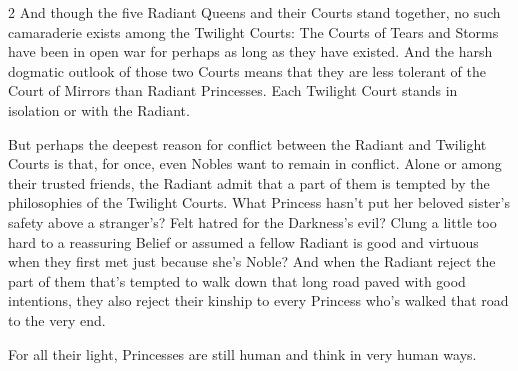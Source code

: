 \begin{multicols}{2}
And though the five Radiant Queens and their Courts stand together, no such camaraderie exists among the Twilight Courts: The Courts of Tears and Storms have been in open war for perhaps as long as they have existed. And the harsh dogmatic outlook of those two Courts means that they are less tolerant of the Court of Mirrors than Radiant Princesses. Each Twilight Court stands in isolation or with the Radiant. 

But perhaps the deepest reason for conflict between the Radiant and Twilight Courts is that, for once, even Nobles want to remain in conflict. Alone or among their trusted friends, the Radiant admit that a part of them is tempted by the philosophies of the Twilight Courts. What Princess hasn't put her beloved sister's safety above a stranger's? Felt hatred for the Darkness's evil? Clung a little too hard to a reassuring Belief or assumed a fellow Radiant is good and virtuous when they first met just because she's Noble? And when the Radiant reject the part of them that's tempted to walk down that long road paved with good intentions, they also reject their kinship to every Princess who's walked that road to the very end. 

For all their light, Princesses are still human and think in very human ways. 

\end{multicols}
